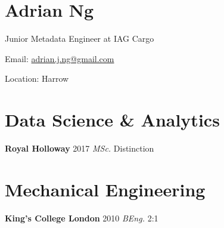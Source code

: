 \documentclass[../cv.tex]{subfiles}
\begin{document}
\section{Adrian Ng}
Junior Metadata Engineer at IAG Cargo
\hfill
\begin{description*}
	\item[Email:] \href{mailto:adrian.j.ng@gmail.com}{adrian.j.ng@gmail.com}
	\item[Location:] Harrow
\end{description*}
\vspace{0.25cm}
\noindent
\newline
\begin{minipage}[t]{0.6\linewidth}
	\begin{minipage}[t]{0.5\linewidth}
		\section{Data Science \& Analytics}
		\textbf{Royal Holloway} \hfill 2017
		\newline
		\textit{MSc.} \hfill Distinction
	\end{minipage}
	\hspace{0.2em}
	\begin{minipage}[t]{0.5\linewidth}
		\section{Mechanical Engineering}
		\textbf{King's College London} \hfill 2010
		\newline
		\textit{BEng.} \hfill 2:1
	\end{minipage}
\end{minipage}
\end{document}

